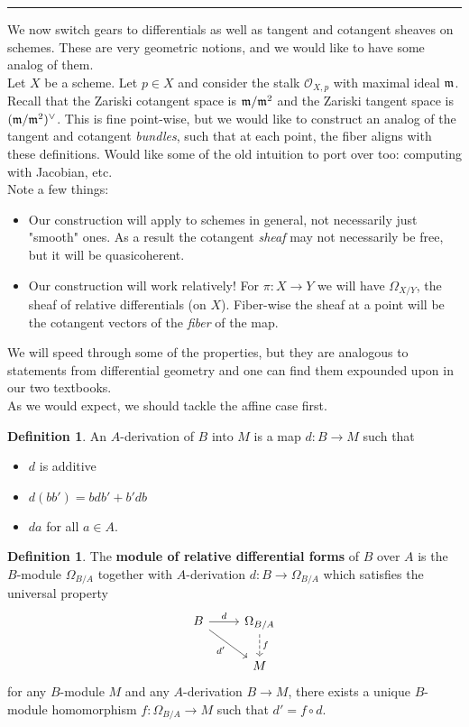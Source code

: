 \documentclass[10pt,reqno]{amsart}
\theoremstyle{definition}
\newtheorem{definition}[theorem]{Definition}
\theoremstyle{remark}
\numberwithin{equation}{section}
\numberwithin{theorem}{section}
\newcommand{\OO}{{\mathcal O}}
\newcommand{\mm}{\frak{m}}
\begin{document}
\hrule
\vspace{1em}

We now switch gears to differentials as well as tangent and cotangent sheaves on schemes. These are very geometric notions, and we would like to have some analog of them.
\\

Let $X$ be a scheme. Let $p \in X$ and consider the stalk $\OO_{X,p}$ with maximal ideal $\mm$. Recall that the Zariski cotangent space is $\mm/\mm^2$ and the Zariski tangent space is $(\mm/\mm^2)^{\vee}$. This is fine point-wise, but we would like to construct an analog of the tangent and cotangent \textit{bundles}, such that at each point, the fiber aligns with these definitions. Would like some of the old intuition to port over too: computing with Jacobian, etc.
\\

Note a few things:
\begin{itemize}
\item Our construction will apply to schemes in general, not necessarily just "smooth" ones. As a result the cotangent \textit{sheaf} may not necessarily be free, but it will be quasicoherent.
\item Our construction will work relatively! For $\pi: X \to Y$ we will have $\Omega_{X/Y}$, the sheaf of relative differentials (on $X$). Fiber-wise the sheaf at a point will be the cotangent vectors of the \textit{fiber} of the map.
\end{itemize} 

We will speed through some of the properties, but they are analogous to statements from differential geometry and one can find them expounded upon in our two textbooks.
\\

As we would expect, we should tackle the affine case first.

\begin{definition} An $A$-derivation of $B$ into $M$ is a map $d: B \to M$ such that
\begin{itemize}
\item $d$ is additive
\item $d(bb') = bdb' + b'db$
\item $da$ for all $a \in A$.
\end{itemize}
\end{definition}

\begin{definition} The \textbf{module of relative differential forms} of $B$ over $A$ is the $B$-module $\Omega_{B/A}$ together with $A$-derivation $d: B \to \Omega_{B/A}$ which satisfies the universal property
\[
\begin{tikzcd}
B \arrow[r, "d"] \arrow[dr, "d'", swap]& \Omega_{B/A} \arrow[d,dashed, "f"]\\
& M
\end{tikzcd}
\]
for any $B$-module $M$ and any $A$-derivation $B \to M$, there exists a unique $B$-module homomorphism $f: \Omega_{B/A} \to M$ such that $d' = f \circ d$.
\end{definition}
\end{document}
